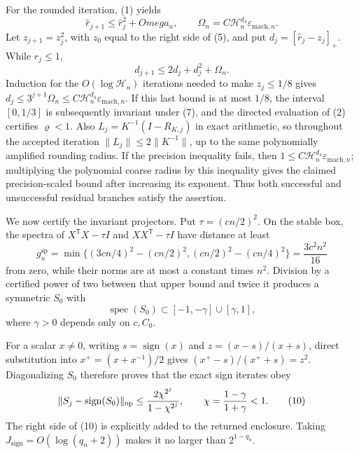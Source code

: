 For the rounded iteration, (1) yields
\[
\widehat r_{j+1}\le \widehat r_j^2+Omega_n,
\qquad
\Omega_n=C\mathcal H_n^{d_3}\varepsilon_{
\mathrm{mach},n}.                                                     \tag{7}
\]
Let \(z_{j+1}=z_j^2\), with \(z_0\) equal to the right side of (5), and put
\(d_j=[\widehat r_j-z_j]_+\).  While \(\widehat r_j\le1\),
\[
d_{j+1}\le2d_j+d_j^2+\Omega_n.
\]
Induction for the \(O(\log\mathcal H_n)\) iterations needed to make
\(z_j\le1/8\) gives
\(d_j\le3^{j+1}\Omega_n\le C\mathcal H_n^{d_4}\varepsilon_{
\mathrm{mach},n}\).  If this last bound is at most \(1/8\), the interval
\([0,1/3]\) is subsequently invariant under (7), and the directed evaluation
of (2) certifies \(\varrho<1\).  Also
\(L_j=K^{-1}(I-R_{K,j})\) in exact arithmetic, so throughout the accepted
iteration \(\|L_j\|\le2\|K^{-1}\|\), up to the same polynomially amplified
rounding radius.  If the precision inequality fails, then
\(1\le C\mathcal H_n^{d_4}\varepsilon_{
\mathrm{mach},n}\); multiplying the polynomial coarse radius by this inequality
gives the claimed precision-scaled bound after increasing its exponent.  Thus
both successful and unsuccessful residual branches satisfy the assertion.

We now certify the invariant projectors.  Put \(\tau=(cn/2)^2\).  On the stable
box, the spectra of \(X^{\mathsf T}X-\tau I\) and
\(XX^{\mathsf T}-\tau I\) have distance at least
\[
g_n^{\mathrm{sp}}
=\min\{(3cn/4)^2-(cn/2)^2,(cn/2)^2-(cn/4)^2\}
=\frac{3c^2n^2}{16}                                                   \tag{8}
\]
from zero, while their norms are at most a constant times \(n^2\).  Division by
a certified power of two between that upper bound and twice it produces a
symmetric \(S_0\) with
\[
\operatorname{spec}(S_0)\subset[-1,-\gamma]\cup[\gamma,1],           \tag{9}
\]
where \(\gamma>0\) depends only on \(c,C_0\).

For a scalar \(x\ne0\), writing \(s=\operatorname{sign}(x)\) and
\(z=(x-s)/(x+s)\), direct substitution into
\(x^+=(x+x^{-1})/2\) gives \((x^+-s)/(x^++s)=z^2\).  Diagonalizing \(S_0\)
therefore proves that the exact sign iterates obey
\[
\|S_j-\operatorname{sign}(S_0)\|_{
\mathrm{op}}
\le {2\chi^{2^j}\over1-\chi^{2^j}},
\qquad \chi={1-\gamma\over1+\gamma}<1.                               \tag{10}
\]
The right side of (10) is explicitly added to the returned enclosure.  Taking
\(J_{
\mathrm{sign}}=O(\log(q_n+2))\) makes it no larger than
\(2^{1-q_n}\).

